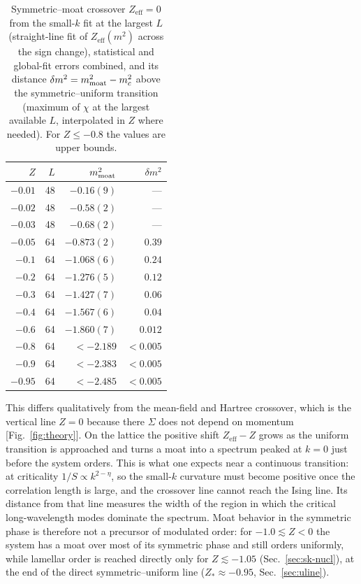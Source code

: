 \documentclass[aps,prd,twocolumn,superscriptaddress,nofootinbib,10pt]{revtex4-2}
\newcommand{\eff}{\mathrm{eff}}
\begin{document}
\begin{table}[t]
\caption{Symmetric--moat crossover $Z_\eff=0$ from the small-$k$ fit at
the largest $L$ (straight-line fit of $Z_\eff(m^2)$ across the sign
change), statistical and global-fit errors combined, and
its distance $\delta m^2=m^2_{\rm moat}-m^2_c$ above the symmetric--uniform
transition (maximum of $\chi$ at the largest available $L$, interpolated in
$Z$ where needed).  For $Z\le-0.8$ the values are upper bounds.}
\label{tab:moat}
\begin{ruledtabular}
\begin{tabular}{rrrr}
$Z$ & $L$ & $m^2_{\rm moat}$ & $\delta m^2$\\\hline
$-0.01$ & 48 & $-0.16(9)$   & ---\\
$-0.02$ & 48 & $-0.58(2)$   & ---\\
$-0.03$ & 48 & $-0.68(2)$   & ---\\
$-0.05$ & 64 & $-0.873(2)$  & $0.39$\\
$-0.1$  & 64 & $-1.068(6)$  & $0.24$\\
$-0.2$  & 64 & $-1.276(5)$  & $0.12$\\
$-0.3$  & 64 & $-1.427(7)$  & $0.06$\\
$-0.4$  & 64 & $-1.567(6)$  & $0.04$\\
$-0.6$  & 64 & $-1.860(7)$  & $0.012$\\
$-0.8$  & 64 & $<-2.189$    & $<0.005$\\
$-0.9$  & 64 & $<-2.383$    & $<0.005$\\
$-0.95$ & 64 & $<-2.485$    & $<0.005$\\
\end{tabular}
\end{ruledtabular}
\end{table}

This differs qualitatively from the mean-field and Hartree crossover, which
is the vertical line $Z=0$ because there $\Sigma$ does not depend on
momentum [Fig.~\ref{fig:theory}].  On the lattice the positive shift
$Z_\eff-Z$ grows as the uniform transition is approached and turns a moat
into a spectrum peaked at $k=0$ just before the system orders.  This is
what one expects near a continuous transition: at criticality
$1/S\propto k^{2-\eta}$, so the small-$k$ curvature must become positive
once the correlation length is large, and the crossover line cannot reach
the Ising line.  Its distance from that line measures the width of the
region in which the critical long-wavelength modes dominate the spectrum.
Moat behavior in the symmetric phase is therefore not a precursor of
modulated order: for $-1.0\lesssim Z<0$ the system has a moat over most of
its symmetric phase and still orders uniformly, while lamellar order is
reached directly only for $Z\lesssim-1.05$ (Sec.~\ref{sec:sk-nucl}), at the
end of the direct symmetric--uniform line ($Z_*\approx-0.95$,
Sec.~\ref{sec:uline}).
\end{document}
